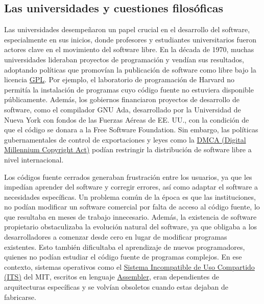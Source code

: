 \documentclass[a4paper,12pt]{article}
\begin{document}
\subsection{Las universidades y cuestiones filosóficas} Las universidades
desempeñaron un papel crucial en el desarrollo del software, especialmente en
sus inicios, donde profesores y estudiantes universitarios fueron actores clave
en el movimiento del software libre. En la década de 1970, muchas universidades
lideraban proyectos de programación y vendían sus resultados, adoptando
políticas que promovían la publicación de software como libre bajo la licencia
\hyperlink{gpl}{GPL}. Por ejemplo, el laboratorio de programación de Harvard no
permitía la instalación de programas cuyo código fuente no estuviera disponible
públicamente. Además, los gobiernos financiaron proyectos de desarrollo de
software, como el compilador GNU Ada, desarrollado por la Universidad de Nueva
York con fondos de las Fuerzas Aéreas de EE. UU., con la condición de que el
código se donara a la Free Software Foundation. Sin embargo, las políticas
gubernamentales de control de exportaciones y leyes como la \hyperlink{dmca}{DMCA
(Digital Millennium Copyright Act)} podían restringir la distribución de
software libre a nivel internacional.

Los códigos fuente cerrados generaban frustración entre los usuarios, ya que les
impedían aprender del software y corregir errores, así como adaptar el software
a necesidades específicas. Un problema común de la época es que las
instituciones, no podían modificar un software comercial por falta de acceso al
código fuente, lo que resultaba en meses de trabajo innecesario. Además, la
existencia de software propietario obstaculizaba la evolución natural del
software, ya que obligaba a los desarrolladores a comenzar desde cero en lugar
de modificar programas existentes. Esto también dificultaba el aprendizaje de
nuevos programadores, quienes no podían estudiar el código fuente de programas
complejos. En ese contexto, sistemas operativos como el \hyperlink{its}{Sistema
Incompatible de Uso Compartido (ITS)} del MIT, escritos en lenguaje
\hyperlink{assembler}{Assembler}, eran dependientes de arquitecturas específicas
y se volvían obsoletos cuando estas dejaban de fabricarse. 
\end{document}
